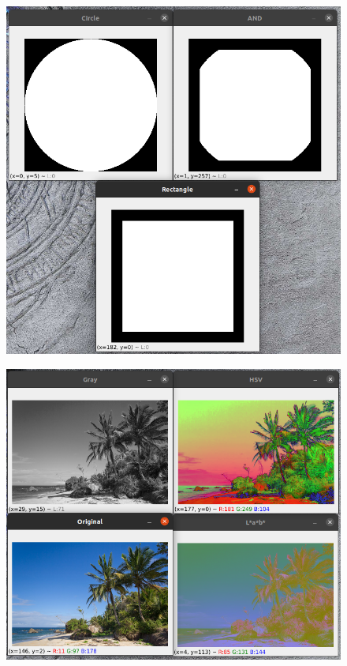 \documentclass[12pt,letterpaper]{article}
\begin{document}
\begin{multicols}{2}
\begin{figure}[H]
\centering
\includegraphics[width = \columnwidth]{Resultado_ch6_2.png}
\end{figure}

\begin{figure}[H]
\centering
\includegraphics[width = \columnwidth]{Resultado_ch6_3.png}
\end{figure}


\end{multicols}
\end{document}
